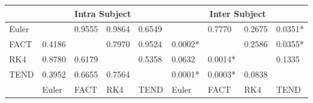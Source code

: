 \documentclass{frontiersSCNS} %
\begin{document}

\begin{table}[!t]
{
\begin{tabular}{l | llll | llll }
\midrule
 & \multicolumn{4}{c}{Intra Subject}  & \multicolumn{4}{c}{Inter Subject} \\ 
\midrule
Euler  &            & 0.9555  & 0.9864    & 0.6549   &              & 0.7770  & 0.2675 & 0.0351*  \\
FACT & 0.4186 &              & 0.7970  & 0.9524     & 0.0002*  &             & 0.2586 & 0.0355* \\
RK4   & 0.8780 & 0.6179   &               & 0.5358   & 0.0632   & 0.0014* &            & 0.1335   \\
TEND & 0.3952 & 0.6655  & 0.7564    &            &    0.0001*  & 0.0003* & 0.0838 &               \\             
\midrule
         & Euler    & FACT     & RK4        & TEND      & Euler     & FACT     & RK4     & TEND       \\
\midrule
\end{tabular}}{}
\end{table}
\end{document}
